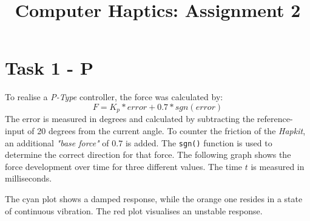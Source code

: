



  \title{Computer Haptics: Assignment 2}
  \maketitle

  \section*{Task 1 - P}

  To realise a \textit{P-Type} controller, the force was calculated by:
  \begin{equation*}
    F = K_p * error + 0.7 * sgn(error)
  \end{equation*}
  The error is measured in degrees and calculated by subtracting the reference-input of 20 degrees from the current angle. To counter the friction of the \textit{Hapkit}, an additional \textit{"base force"} of $0.7$ is added. The \texttt{sgn()} function is used to determine the correct direction for that force. The following graph shows the force development over time for three different values. The time $t$ is measured in milliseconds.

  \begin{figure}[H]
    \centering
  \end{figure}

  The cyan plot shows a damped response, while the orange one resides in a state of continuous vibration. The red plot visualises an unstable response.

